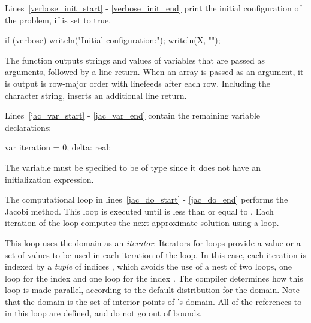 Lines~\ref{verbose_init_start} - \ref{verbose_init_end} print the initial 
configuration of the problem, if 
is set to true.  
\begin{chapel}
  if (verbose) {                      
    writeln("Initial configuration:");
    writeln(X, "\n");
  }                                   
\end{chapel}
The   function outputs strings and values
of variables that are passed as arguments, followed by a line return.
When an array is passed as an argument, it is output is row-major order with linefeeds
after each row.  
Including the character string,  inserts an 
additional line return.


Lines~\ref{jac_var_start} - \ref{jac_var_end} 
contain the remaining variable declarations:
\begin{chapel}
  var iteration = 0,
      delta: real;
\end{chapel}
The variable  must be specified to be of type  since
it does not have an initialization expression.

The computational loop in lines~\ref{jac_do_start} - \ref{jac_do_end}  
performs the Jacobi method.
This loop is executed until  is less than or equal to .
Each iteration of the  loop computes the next approximate
solution using a  loop.   
\begin{chapel}
  do{
    forall (i,j) in ProblemSpace do
      XNew(i,j) = (X(i-1,j) + X(i+1,j) + X(i,j-1) + X(i,j+1)) / 4.0;
\end{chapel}
This loop 
uses the  domain as an {\em iterator}.  Iterators
for loops provide a value or a set of values to be used in each iteration
of the loop.  In this case, each iteration 
is indexed by a {\em tuple}  of indices , which avoids the use of
a nest of two loops, one loop for the index  and one loop for the
index .  The compiler determines how this loop is made parallel, according
to the default distribution for the  domain.   
Note that the  domain is the set of interior points of 
's domain.  All of the references to  in this loop are
defined, and do not go out of bounds.  

